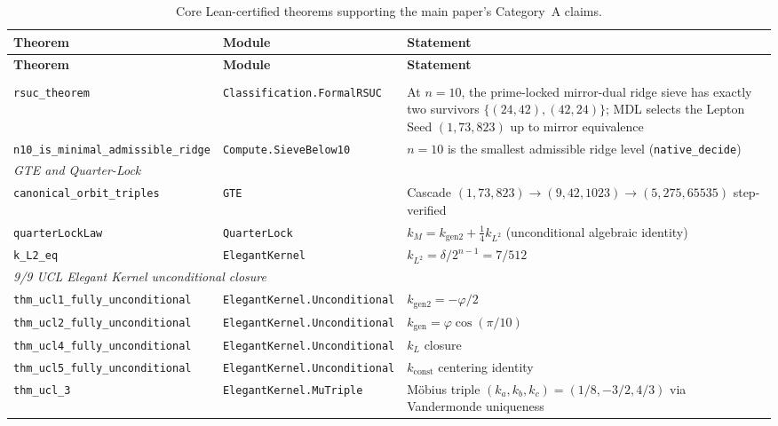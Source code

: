\documentclass[10pt]{article}
\begin{document}
\begin{longtable}{@{} p{3.8cm} p{4.8cm} p{4.8cm} @{}}
\caption{Core Lean-certified theorems supporting the main paper's Category~A claims.}
\label{tab:si_lean} \\
\toprule
\textbf{Theorem} & \textbf{Module} & \textbf{Statement} \\
\midrule
\endfirsthead
\toprule
\textbf{Theorem} & \textbf{Module} & \textbf{Statement} \\
\midrule
\endhead
\bottomrule
\endfoot

\multicolumn{3}{l}{\textit{RSUC and Ridge Minimality}} \\[2pt]
\nolinkurl{rsuc_theorem} & \nolinkurl{Classification.FormalRSUC} & At $n=10$, the prime-locked mirror-dual ridge sieve has exactly two survivors $\{(24,42),(42,24)\}$; MDL selects the Lepton Seed $(1, 73, 823)$ up to mirror equivalence \\
\nolinkurl{n10_is_minimal_admissible_ridge} & \nolinkurl{Compute.SieveBelow10} & $n = 10$ is the smallest admissible ridge level (\texttt{native\_decide}) \\[4pt]

\multicolumn{3}{l}{\textit{GTE and Quarter-Lock}} \\[2pt]
\nolinkurl{canonical_orbit_triples} & \nolinkurl{GTE} & Cascade $(1,73,823) \to (9,42,1023) \to (5,275,65535)$ step-verified \\
\nolinkurl{quarterLockLaw} & \nolinkurl{QuarterLock} & $k_M = k_{\mathrm{gen2}} + \tfrac{1}{4}k_{L^2}$ (unconditional algebraic identity) \\
\nolinkurl{k_L2_eq} & \nolinkurl{ElegantKernel} & $k_{L^2} = \delta/2^{n-1} = 7/512$ \\[4pt]

\multicolumn{3}{l}{\textit{9/9 UCL Elegant Kernel unconditional closure}} \\[2pt]
\nolinkurl{thm_ucl1_fully_unconditional} & \nolinkurl{ElegantKernel.Unconditional} & $k_{\mathrm{gen2}} = -\varphi/2$ \\
\nolinkurl{thm_ucl2_fully_unconditional} & \nolinkurl{ElegantKernel.Unconditional} & $k_{\mathrm{gen}} = \varphi\cos(\pi/10)$ \\
\nolinkurl{thm_ucl4_fully_unconditional} & \nolinkurl{ElegantKernel.Unconditional} & $k_L$ closure \\
\nolinkurl{thm_ucl5_fully_unconditional} & \nolinkurl{ElegantKernel.Unconditional} & $k_{\mathrm{const}}$ centering identity \\
\nolinkurl{thm_ucl_3} & \nolinkurl{ElegantKernel.MuTriple} & M\"obius triple $(k_a, k_b, k_c) = (1/8, -3/2, 4/3)$ via Vandermonde uniqueness \\[4pt]


\end{longtable}
\end{document}
